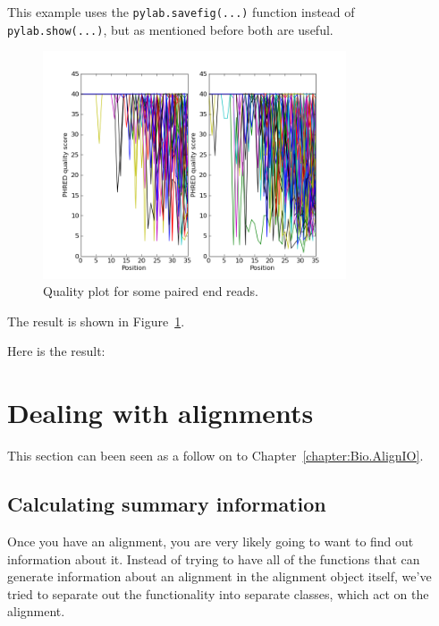 \documentclass{report}
\begin{document}
This example uses the \verb|pylab.savefig(...)| function instead of
\verb|pylab.show(...)|, but as mentioned before both are useful.
\begin{latexonly}
\begin{figure}[htbp]
\centering
\includegraphics[width=0.8\textwidth]{images/SRR001666.png}
\caption{Quality plot for some paired end reads.}
\label{fig:paired-end-qual-plot}
\end{figure}
The result is shown in Figure~\ref{fig:paired-end-qual-plot}.
\end{latexonly}
\begin{htmlonly}
Here is the result:


\end{htmlonly}

\section{Dealing with alignments}

This section can been seen as a follow on to Chapter~\ref{chapter:Bio.AlignIO}.

\subsection{Calculating summary information}
\label{sec:summary_info}

Once you have an alignment, you are very likely going to want to find out information about it. Instead of trying to have all of the functions that can generate information about an alignment in the alignment object itself, we've tried to separate out the functionality into separate classes, which act on the alignment.
\end{document}
